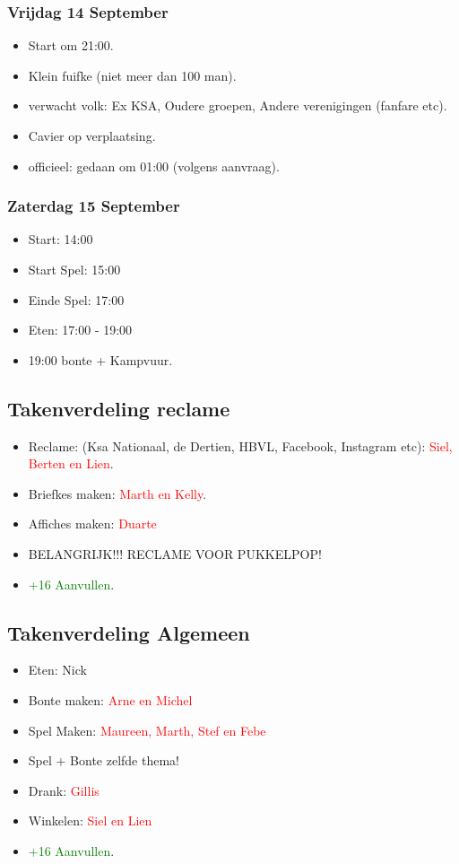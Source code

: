 \documentclass[pdftex,12pt,a4paper,english,titlepage]{article}
\begin{document}
\subsubsection{Vrijdag 14 September}
\begin{itemize}
	\item Start om 21:00.
	\item Klein fuifke (niet meer dan 100 man).
	\item verwacht volk: Ex KSA, Oudere groepen, Andere verenigingen (fanfare etc).
	\item Cavier op verplaatsing.
	\item officieel: gedaan om 01:00 (volgens aanvraag).
\end{itemize}

\subsubsection{Zaterdag 15 September}
\begin{itemize}
	\item Start: 14:00
	\item Start Spel: 15:00
	\item Einde Spel: 17:00
	\item Eten: 17:00 - 19:00
	\item 19:00 bonte + Kampvuur.
\end{itemize}

\subsection{Takenverdeling reclame}
\begin{itemize}
	\item Reclame: (Ksa Nationaal, de Dertien, HBVL, Facebook, Instagram etc): \textcolor{red}{Siel, Berten en Lien}.
	\item Briefkes maken: \textcolor{red}{Marth en Kelly}.
	\item Affiches maken: \textcolor{red}{Duarte}
	\item BELANGRIJK!!! RECLAME VOOR PUKKELPOP!
	\item \textcolor{green}{+16 Aanvullen}.
\end{itemize}

\subsection{Takenverdeling Algemeen}
\begin{itemize}
	\item Eten: Nick
	\item Bonte maken: \textcolor{red}{Arne en Michel}
	\item Spel Maken: \textcolor{red}{Maureen, Marth, Stef en Febe}
	\item Spel + Bonte zelfde thema!
	\item Drank: \textcolor{red}{Gillis}
	\item Winkelen: \textcolor{red}{Siel en Lien}
	\item \textcolor{green}{+16 Aanvullen}.
\end{itemize}
\end{document}
